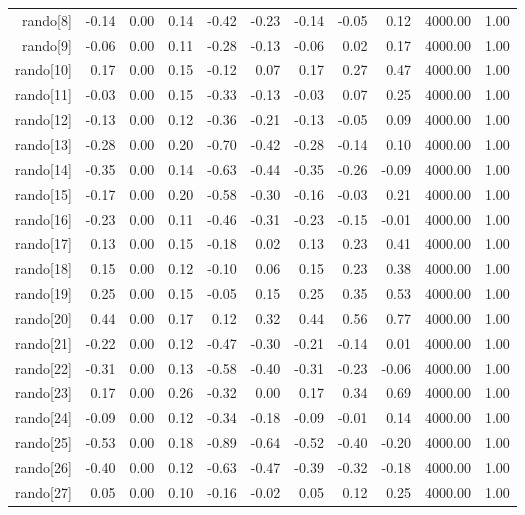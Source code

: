 \begin{table}[ht]
\begin{tabular}{rrrrrrrrrrr}
  rando[8] & -0.14 & 0.00 & 0.14 & -0.42 & -0.23 & -0.14 & -0.05 & 0.12 & 4000.00 & 1.00 \\ 
  rando[9] & -0.06 & 0.00 & 0.11 & -0.28 & -0.13 & -0.06 & 0.02 & 0.17 & 4000.00 & 1.00 \\ 
  rando[10] & 0.17 & 0.00 & 0.15 & -0.12 & 0.07 & 0.17 & 0.27 & 0.47 & 4000.00 & 1.00 \\ 
  rando[11] & -0.03 & 0.00 & 0.15 & -0.33 & -0.13 & -0.03 & 0.07 & 0.25 & 4000.00 & 1.00 \\ 
  rando[12] & -0.13 & 0.00 & 0.12 & -0.36 & -0.21 & -0.13 & -0.05 & 0.09 & 4000.00 & 1.00 \\ 
  rando[13] & -0.28 & 0.00 & 0.20 & -0.70 & -0.42 & -0.28 & -0.14 & 0.10 & 4000.00 & 1.00 \\ 
  rando[14] & -0.35 & 0.00 & 0.14 & -0.63 & -0.44 & -0.35 & -0.26 & -0.09 & 4000.00 & 1.00 \\ 
  rando[15] & -0.17 & 0.00 & 0.20 & -0.58 & -0.30 & -0.16 & -0.03 & 0.21 & 4000.00 & 1.00 \\ 
  rando[16] & -0.23 & 0.00 & 0.11 & -0.46 & -0.31 & -0.23 & -0.15 & -0.01 & 4000.00 & 1.00 \\ 
  rando[17] & 0.13 & 0.00 & 0.15 & -0.18 & 0.02 & 0.13 & 0.23 & 0.41 & 4000.00 & 1.00 \\ 
  rando[18] & 0.15 & 0.00 & 0.12 & -0.10 & 0.06 & 0.15 & 0.23 & 0.38 & 4000.00 & 1.00 \\ 
  rando[19] & 0.25 & 0.00 & 0.15 & -0.05 & 0.15 & 0.25 & 0.35 & 0.53 & 4000.00 & 1.00 \\ 
  rando[20] & 0.44 & 0.00 & 0.17 & 0.12 & 0.32 & 0.44 & 0.56 & 0.77 & 4000.00 & 1.00 \\ 
  rando[21] & -0.22 & 0.00 & 0.12 & -0.47 & -0.30 & -0.21 & -0.14 & 0.01 & 4000.00 & 1.00 \\ 
  rando[22] & -0.31 & 0.00 & 0.13 & -0.58 & -0.40 & -0.31 & -0.23 & -0.06 & 4000.00 & 1.00 \\ 
  rando[23] & 0.17 & 0.00 & 0.26 & -0.32 & 0.00 & 0.17 & 0.34 & 0.69 & 4000.00 & 1.00 \\ 
  rando[24] & -0.09 & 0.00 & 0.12 & -0.34 & -0.18 & -0.09 & -0.01 & 0.14 & 4000.00 & 1.00 \\ 
  rando[25] & -0.53 & 0.00 & 0.18 & -0.89 & -0.64 & -0.52 & -0.40 & -0.20 & 4000.00 & 1.00 \\ 
  rando[26] & -0.40 & 0.00 & 0.12 & -0.63 & -0.47 & -0.39 & -0.32 & -0.18 & 4000.00 & 1.00 \\ 
  rando[27] & 0.05 & 0.00 & 0.10 & -0.16 & -0.02 & 0.05 & 0.12 & 0.25 & 4000.00 & 1.00 \\ 

\end{tabular}
\end{table}
